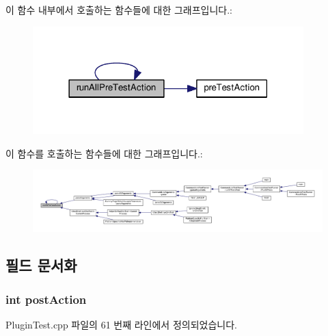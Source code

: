 이 함수 내부에서 호출하는 함수들에 대한 그래프입니다.\+:
\nopagebreak
\begin{figure}[H]
\begin{center}
\leavevmode
\includegraphics[width=297pt]{class_test_plugin_aa3524b10b0f1613104fa75f1c1a72cf6_cgraph}
\end{center}
\end{figure}




이 함수를 호출하는 함수들에 대한 그래프입니다.\+:
\nopagebreak
\begin{figure}[H]
\begin{center}
\leavevmode
\includegraphics[width=350pt]{class_test_plugin_aa3524b10b0f1613104fa75f1c1a72cf6_icgraph}
\end{center}
\end{figure}




\subsection{필드 문서화}
\subsubsection[{\texorpdfstring{post\+Action}{postAction}}]{\setlength{\rightskip}{0pt plus 5cm}int post\+Action}\hypertarget{class_dummy_plugin_a4c4d5ce432729ca33e33d1c1a2dde7f7}{}\label{class_dummy_plugin_a4c4d5ce432729ca33e33d1c1a2dde7f7}


Plugin\+Test.\+cpp 파일의 61 번째 라인에서 정의되었습니다.

